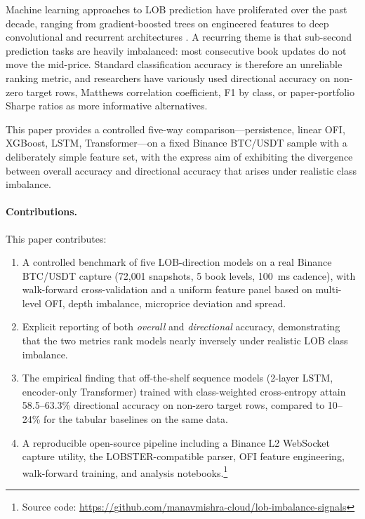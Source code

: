 \documentclass[11pt]{article}
\begin{document}
Machine learning approaches to LOB prediction have proliferated over
the past decade, ranging from gradient-boosted trees on engineered
features to deep convolutional and recurrent architectures
\citep{sirignano2019universal, briola2020deep, ntakaris2018benchmark}.
A recurring theme is that sub-second prediction tasks are heavily
imbalanced: most consecutive book updates do not move the mid-price.
Standard classification accuracy is therefore an unreliable ranking
metric, and researchers have variously used directional accuracy on
non-zero target rows, Matthews correlation coefficient, F1 by class,
or paper-portfolio Sharpe ratios as more informative alternatives.

This paper provides a controlled five-way comparison---persistence,
linear OFI, XGBoost, LSTM, Transformer---on a fixed Binance BTC/USDT
sample with a deliberately simple feature set, with the express aim
of exhibiting the divergence between overall accuracy and directional
accuracy that arises under realistic class imbalance.

\paragraph{Contributions.} This paper contributes:

\begin{enumerate}
  \item A controlled benchmark of five LOB-direction models on a real
  Binance BTC/USDT capture (72{,}001 snapshots, 5 book levels, 100~ms
  cadence), with walk-forward cross-validation and a uniform feature
  panel based on multi-level OFI, depth imbalance, microprice deviation
  and spread.
  \item Explicit reporting of both \emph{overall} and \emph{directional}
  accuracy, demonstrating that the two metrics rank models nearly
  inversely under realistic LOB class imbalance.
  \item The empirical finding that off-the-shelf sequence models
  (2-layer LSTM, encoder-only Transformer) trained with class-weighted
  cross-entropy attain 58.5--63.3\% directional accuracy on non-zero
  target rows, compared to 10--24\% for the tabular baselines on the
  same data.
  \item A reproducible open-source pipeline including a Binance L2
  WebSocket capture utility, the LOBSTER-compatible parser, OFI
  feature engineering, walk-forward training, and analysis
  notebooks.\footnote{Source code:
  \url{https://github.com/manavmishra-cloud/lob-imbalance-signals}}
\end{enumerate}
\end{document}

